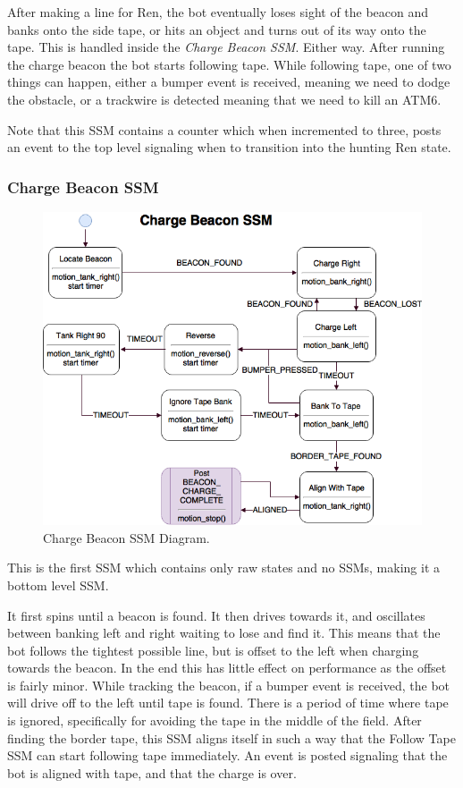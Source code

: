 \documentclass[]{article}
\begin{document}
After making a line for Ren, the bot eventually loses sight of the beacon and banks onto the side tape, or hits an object and turns out of its way onto the tape. This is handled inside the \textit{Charge Beacon SSM}. Either way. After running the charge beacon the bot starts following tape. While following tape, one of two things can happen, either a bumper event is received, meaning we need to dodge the obstacle, or a trackwire is detected meaning that we need to kill an ATM6.

Note that this SSM contains a counter which when incremented to three, posts an event to the top level signaling when to transition into the hunting Ren state.

\subsubsection{Charge Beacon SSM}
\begin{figure}[H]
    \centering
    \includegraphics[scale=0.60]{charge-beacon-ssm.png}
    \caption{Charge Beacon SSM Diagram.}
    \label{fig: charge beacon ssm}
\end{figure}

This is the first SSM which contains only raw states and no SSMs, making it a bottom level SSM.

It first spins until a beacon is found. It then drives towards it, and oscillates between banking left and right waiting to lose and find it. This means that the bot follows the tightest possible line, but is offset to the left when charging towards the beacon. In the end this has little effect on performance as the offset is fairly minor. While tracking the beacon, if a bumper event is received, the bot will drive off to the left until tape is found. There is a period of time where tape is ignored, specifically for avoiding the tape in the middle of the field. After finding the border tape, this SSM aligns itself in such a way that the Follow Tape SSM can start following tape immediately. An event is posted signaling that the bot is aligned with tape, and that the charge is over.
\end{document}
